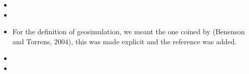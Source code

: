 \documentclass[11pt,a4paper,sans]{moderncv}        %
\begin{document}
\begin{itemize}
	\item 
	
	\item {}
	
	\item For the definition of geosimulation, we meant the one coined by (Benenson and Torrens, 2004), this was made explicit and the reference was added. 
	
	\item 
	
	\item 


\end{itemize}
\end{document}

